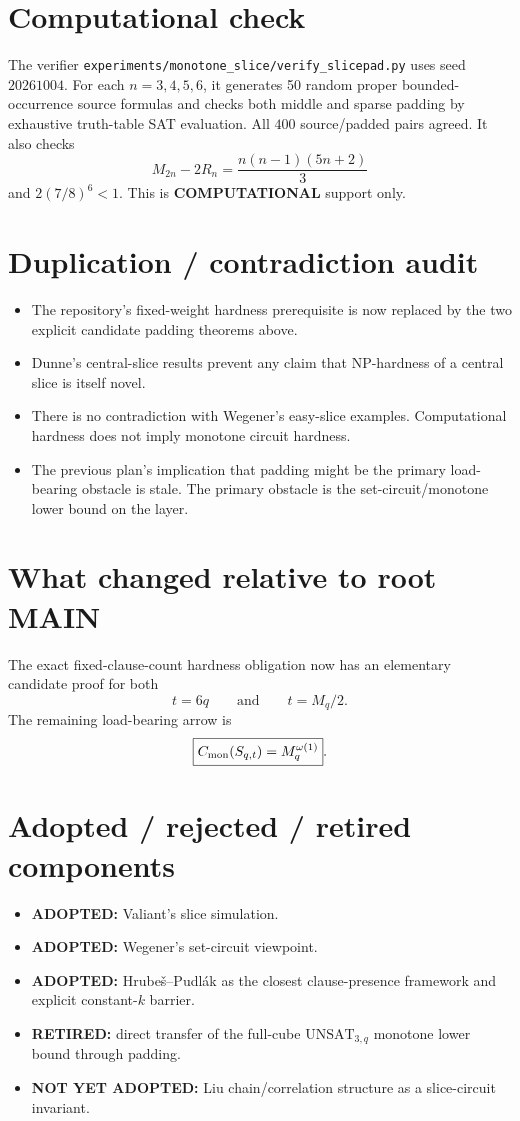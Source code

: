 \documentclass[11pt]{article}
\begin{document}
\section{Computational check}
The verifier \texttt{experiments/monotone\_slice/verify\_slicepad.py} uses seed \(20261004\). For each \(n=3,4,5,6\), it generates 50 random proper bounded-occurrence source formulas and checks both middle and sparse padding by exhaustive truth-table SAT evaluation. All \(400\) source/padded pairs agreed. It also checks
\[
M_{2n}-2R_n=\frac{n(n-1)(5n+2)}3
\]
and \(2(7/8)^6<1\). This is \textbf{COMPUTATIONAL} support only.

\section{Duplication / contradiction audit}
\begin{itemize}
\item[] The repository's fixed-weight hardness prerequisite is now replaced by the two explicit candidate padding theorems above.
\item[] Dunne's central-slice results prevent any claim that NP-hardness of a central slice is itself novel.
\item[] There is no contradiction with Wegener's easy-slice examples. Computational hardness does not imply monotone circuit hardness.
\item[] The previous plan's implication that padding might be the primary load-bearing obstacle is stale. The primary obstacle is the set-circuit/monotone lower bound on the layer.
\end{itemize}

\section{What changed relative to root MAIN}
The exact fixed-clause-count hardness obligation now has an elementary candidate proof for both
\[
t=6q
\qquad\text{and}\qquad
t=M_q/2.
\]
The remaining load-bearing arrow is
\[
\boxed{C_{\rm mon}(S_{q,t})=M_q^{\omega(1)}}.
\]

\section{Adopted / rejected / retired components}
\begin{itemize}
\item[] \textbf{ADOPTED:} Valiant's slice simulation.
\item[] \textbf{ADOPTED:} Wegener's set-circuit viewpoint.
\item[] \textbf{ADOPTED:} Hrube\v{s}--Pudl\'ak as the closest clause-presence framework and explicit constant-\(k\) barrier.
\item[] \textbf{RETIRED:} direct transfer of the full-cube \(\mathrm{UNSAT}_{3,q}\) monotone lower bound through padding.
\item[] \textbf{NOT YET ADOPTED:} Liu chain/correlation structure as a slice-circuit invariant.
\end{itemize}
\end{document}
